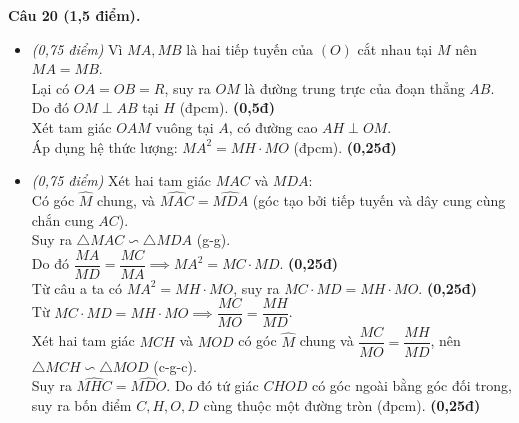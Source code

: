\documentclass[11pt,a4paper]{article}
\begin{document}
\vspace{2mm}
\noindent
\textbf{Câu 20 (1,5 điểm).}
\begin{itemize}
  \item[a)] \textit{(0,75 điểm)}
  Vì $MA, MB$ là hai tiếp tuyến của $(O)$ cắt nhau tại $M$ nên $MA = MB$.\\
  Lại có $OA = OB = R$, suy ra $OM$ là đường trung trực của đoạn thẳng $AB$.\\
  Do đó $OM \perp AB$ tại $H$ (đpcm). \dotfill \textbf{(0,5đ)}\\
  Xét tam giác $OAM$ vuông tại $A$, có đường cao $AH \perp OM$.\\
  Áp dụng hệ thức lượng: $MA^2 = MH \cdot MO$ (đpcm). \dotfill \textbf{(0,25đ)}

  \item[b)] \textit{(0,75 điểm)}
  Xét hai tam giác $MAC$ và $MDA$:\\
  Có góc $\widehat{M}$ chung, và $\widehat{MAC} = \widehat{MDA}$ (góc tạo bởi tiếp tuyến và dây cung cùng chắn cung $AC$).\\
  Suy ra $\triangle MAC \backsim \triangle MDA$ (g-g).\\
  Do đó $\dfrac{MA}{MD} = \dfrac{MC}{MA} \implies MA^2 = MC \cdot MD$. \dotfill \textbf{(0,25đ)}\\
  Từ câu a ta có $MA^2 = MH \cdot MO$, suy ra $MC \cdot MD = MH \cdot MO$. \dotfill \textbf{(0,25đ)}\\
  Từ $MC \cdot MD = MH \cdot MO \implies \dfrac{MC}{MO} = \dfrac{MH}{MD}$.\\
  Xét hai tam giác $MCH$ và $MOD$ có góc $\widehat{M}$ chung và $\dfrac{MC}{MO} = \dfrac{MH}{MD}$, nên $\triangle MCH \backsim \triangle MOD$ (c-g-c).\\
  Suy ra $\widehat{MHC} = \widehat{MDO}$. Do đó tứ giác $CHOD$ có góc ngoài bằng góc đối trong, suy ra bốn điểm $C, H, O, D$ cùng thuộc một đường tròn (đpcm). \dotfill \textbf{(0,25đ)}
\end{itemize}
\end{document}

